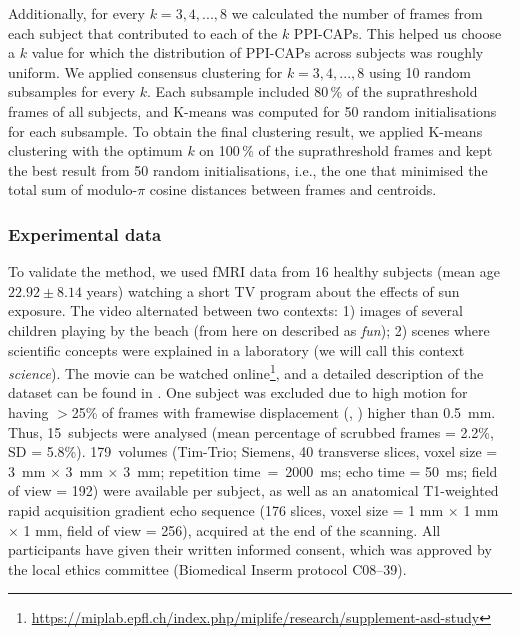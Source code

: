 Additionally, for every $k = {3,4,...,8}$ we calculated the number of frames from each subject that contributed to each of the $k$ PPI-CAPs.
This helped us choose a $k$ value for which the distribution of PPI-CAPs across subjects was roughly uniform. We applied consensus clustering for $k = {3,4,...,8}$ using 10 random subsamples for every $k$. Each subsample included 80\,\% of the suprathreshold frames of all subjects, and K-means was computed for 50 random initialisations for each subsample.
To obtain the final clustering result, we applied K-means clustering with the optimum $k$ on 100\,\% of the suprathreshold frames and kept the best result from 50  random initialisations, i.e., the one that minimised the total sum of modulo-$\pi$ cosine distances between frames and centroids.

\subsubsection{Experimental data}

To validate the method, we used fMRI data from 16 healthy subjects (mean age $22.92 \pm 8.14$ years) watching a short TV program about the effects of sun exposure. The video alternated between two contexts: 1) images of several children playing by the beach (from here on described as \textit{fun}); 2) scenes where scientific concepts were explained in a laboratory (we will call this context \textit{science}). The movie can be watched online\footnote{\url{https://miplab.epfl.ch/index.php/miplife/research/supplement-asd-study}}, and a detailed description of the dataset can be found in \cite{Jochaut2015}. One subject was excluded due to high motion for having $>$25\% of frames with framewise displacement (\citeauthor{Power2010}, \citeyear{Power2010}) higher than 0.5~mm. Thus, 15~subjects were analysed (mean percentage of scrubbed frames = 2.2\%, SD = 5.8\%). 179~volumes (Tim-Trio; Siemens, 40 transverse slices, voxel size = 3~mm $\times$ 3~mm $\times$ 3~mm; repetition time~=~2000~ms; echo time = 50~ms; field of view = 192) were available per subject, as well as an anatomical T1-weighted rapid acquisition gradient echo sequence (176 slices, voxel size = 1 mm $\times$ 1 mm $\times$ 1 mm, field of view = 256), acquired at the end of the scanning. All participants have given their written informed consent, which was approved by the local ethics committee (Biomedical Inserm protocol C08–39).

